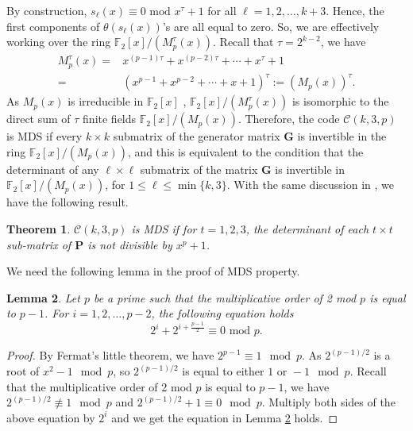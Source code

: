 \documentclass[conference]{IEEEtran}
\newtheorem{theorem}{Theorem}
\newtheorem{lemma}[theorem]{Lemma}
\begin{document}
By construction, $s_\ell(x)\equiv0\mbox{ mod }x^{\tau}+1$ for all $\ell=1,2,\ldots,k+3$. Hence, the first components of $\theta(s_\ell(x))$'s are all equal to zero. So, we are effectively working over the ring $\mathbb{F}_{2}[x]/(M_p^{\tau}(x))$. Recall that $\tau=2^{k-2}$, we have
\begin{align*}
M_p^{\tau}(x)=&x^{(p-1)\tau}+x^{(p-2)\tau}+\cdots+x^{\tau}+1 \\
=&(x^{p-1}+x^{p-2}+\cdots+x+1)^{\tau}:= (M_p(x))^{\tau}.
\end{align*}
As $M_p(x)$ is irreducible in $\mathbb{F}_2[x]$ \cite{Hou2016BASIC}, $\mathbb{F}_{2}[x]/(M_p^{\tau}(x))$ is isomorphic to the direct sum of $\tau$ finite fields $\mathbb{F}_2[x]/(M_p(x))$. Therefore, the code $\mathcal{C}(k,3,p)$ is MDS if every $k \times k$ submatrix of the generator matrix $\mathbf{G}$ is invertible in the ring $\mathbb{F}_2[x]/(M_p(x))$, and this is equivalent to the condition that the determinant of any $\ell \times \ell$ submatrix of the matrix $\mathbf{G}$ is invertible in $\mathbb{F}_2[x]/(M_p(x))$, for $1\leq \ell \leq \min\{k,3\}$.
With the same discussion in \cite{Hou2016BASIC}, we have the following result.


\begin{theorem}
$\mathcal{C}(k,3,p)$ is MDS if for $t=1,2,3$, the determinant of each $t\times t$ sub-matrix of $\mathbf{P}$ is not divisible by $x^p+1$.
  \label{thm:MDS2}
\end{theorem}
We need the following lemma in the proof of MDS property.
\begin{lemma}
Let $p$ be a prime such that the multiplicative order of 2 mod $p$ is equal to $p-1$. For $i=1,2,\ldots,p-2$, the following equation holds
\[
2^i+2^{i+\frac{p-1}{2}}\equiv 0 \text{ mod }p.
\]
\label{lemmap}
\end{lemma}
\begin{proof}
By Fermat's little theorem, we have $2^{p-1}\equiv 1\mod p$. As $2^{(p-1)/2}$ is a root of $x^2-1 \mod p$, so $2^{(p-1)/2}$ is equal to either $1 \text{ or } -1 \mod p$. Recall that the multiplicative order of 2 mod $p$ is equal to $p-1$, we have $2^{(p-1)/2}\not\equiv 1\mod p$ and $2^{(p-1)/2}+1\equiv 0\mod p$. Multiply both sides of the above equation by $2^i$ and we get the equation in Lemma \ref{lemmap} holds.
\end{proof}
\end{document}
